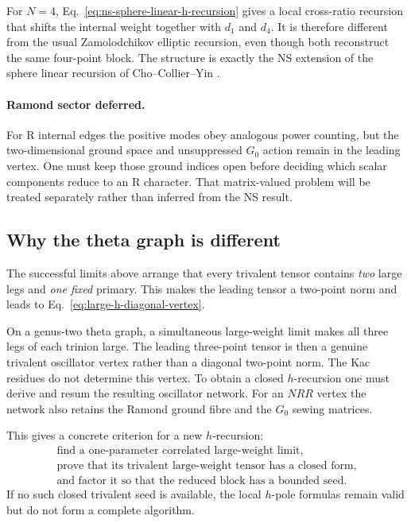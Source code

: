 \documentclass[11pt]{article}
\begin{document}
For \(N=4\), Eq.~\eqref{eq:ns-sphere-linear-h-recursion} gives a local
cross-ratio recursion that shifts the internal weight together with
\(d_1\) and \(d_4\).  It is therefore different from the usual
Zamolodchikov elliptic recursion, even though both reconstruct the same
four-point block.  The structure is exactly the NS extension of the sphere
linear recursion of Cho--Collier--Yin
\cite{ChoCollierYin2017Recursive}.

\paragraph{Ramond sector deferred.}
For R internal edges the positive modes obey analogous power counting, but
the two-dimensional ground space and unsuppressed \(G_0\) action remain in
the leading vertex.  One must keep those ground indices open before deciding
which scalar components reduce to an R character.  That matrix-valued
problem will be treated separately rather than inferred from the NS result.

\subsection{Why the theta graph is different}

The successful limits above arrange that every trivalent tensor contains
\emph{two} large legs and \emph{one fixed} primary.  This makes the leading
tensor a two-point norm and leads to
Eq.~\eqref{eq:large-h-diagonal-vertex}.

On a genus-two theta graph, a simultaneous large-weight limit makes all
three legs of each trinion large.  The leading three-point tensor is then a
genuine trivalent oscillator vertex rather than a diagonal two-point norm.
The Kac residues do not determine this vertex.  To obtain a closed
\(h\)-recursion one must derive and resum the resulting oscillator network.
For an \(NRR\) vertex the network also retains the Ramond ground fibre and
the \(G_0\) sewing matrices.

This gives a concrete criterion for a new \(h\)-recursion:
\begin{equation}
 \boxed{
 \begin{gathered}
 \text{find a one-parameter correlated large-weight limit,}\\
 \text{prove that its trivalent large-weight tensor has a closed form,}\\
 \text{and factor it so that the reduced block has a bounded seed.}
 \end{gathered}}
 \label{eq:new-h-recursion-criterion}
\end{equation}
If no such closed trivalent seed is available, the local \(h\)-pole formulas
remain valid but do not form a complete algorithm.
\end{document}
